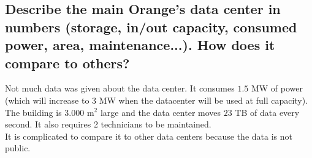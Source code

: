 \documentclass[10pt,a4paper]{ULBreport}
\begin{document}
\subsection{Describe the main Orange's data center in numbers (storage, in/out capacity, consumed power, area, maintenance...). How does it compare to others?}

Not much data was given about the data center. It consumes $1.5$ MW of power (which will increase to $3$ MW when the datacenter will be used at full capacity). The building is $3.000$ m$^2$ large and the data center moves $23$ TB of data every second. It also requires 2 technicians to be maintained. \\
It is complicated to compare it to other data centers because the data is not public.



\end{document}
